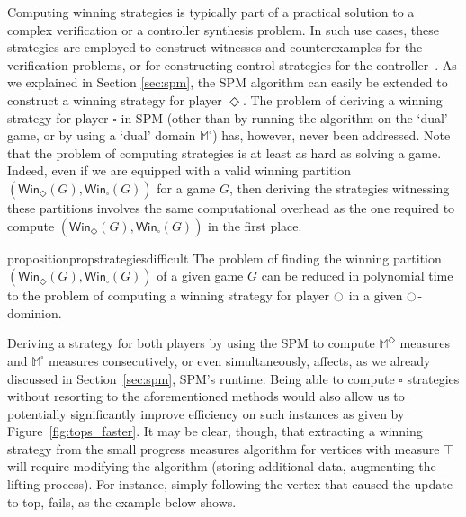 \documentclass{eptcs}
\newcommand{\odd}{\ensuremath{\square}\xspace}
\newcommand{\even}{\ensuremath{\Diamond}\xspace}
\newcommand{\player}{\ensuremath{\ocircle}\xspace}
\newcommand{\winsubodd}[1]{\textsf{Win}_{\odd}(#1)}
\newcommand{\winsubeven}[1]{\textsf{Win}_{\even}(#1)}
\begin{document}
Computing winning strategies is typically part of a practical
solution to a complex verification or a controller synthesis problem.
In such use cases, these strategies are employed to
construct witnesses and counterexamples for the verification problems,
or for constructing control strategies for the controller~\cite{AVW:03}.
As we explained in Section \ref{sec:spm}, the SPM algorithm can
easily be extended to construct a winning strategy for player
$\even$. The problem of deriving a winning strategy for player \odd
in SPM (other than by running the algorithm on the `dual' game, or
by using a `dual' domain $\mathbb{M}^{\odd}$) has, however, never
been addressed. Note that the problem of computing strategies is
at least as hard as solving a game. Indeed, even if we are equipped
with a valid winning partition $(\winsubeven{G},\winsubodd{G})$ for
a game $G$, then deriving the strategies witnessing these partitions
involves the same computational overhead as the one required to
compute $(\winsubeven{G},\winsubodd{G})$ in the first place.
\begin{restatable}{proposition}{propstrategiesdifficult} 
\label{prop:strategies_difficult}
The problem of finding the winning partition
$(\winsubeven{G},\winsubodd{G})$ of a given game $G$ can be reduced
in polynomial time to the problem of computing a winning strategy
for player $\player$ in a given $\player$-dominion.
\end{restatable}

Deriving a strategy for both players by using the SPM to compute
$\mathbb{M}^{\even}$ measures and $\mathbb{M}^{\odd}$ measures
consecutively, or even simultaneously, affects, as we already
discussed in Section~\ref{sec:spm}, SPM's runtime.    Being able
to compute \odd strategies without resorting to the aforementioned
methods would also allow us to potentially significantly improve
efficiency on such instances as given by Figure~\ref{fig:tops_faster}.
It may be clear, though, that extracting a winning strategy from
the small progress measures algorithm for vertices with measure
$\top$ will require modifying the algorithm (storing additional
data, augmenting the lifting process).  For instance, simply following
the vertex that caused the update to top, fails, as the example
below shows.
\end{document}
